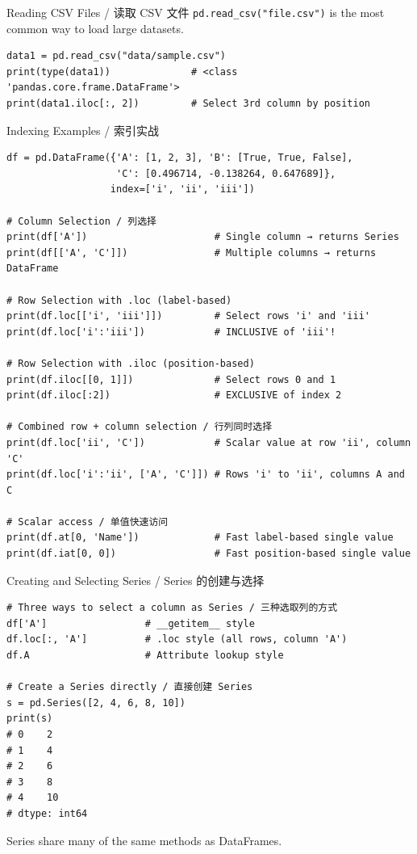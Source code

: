 \documentclass[11pt,a4paper]{report}
\let\oldtexttt\texttt
\renewcommand{\texttt}[1]{\textcolor{mainblue}{\oldtexttt{#1}}}
\begin{document}
\begin{examplebox}{Reading CSV Files / 读取 CSV 文件}
    \texttt{pd.read\_csv("file.csv")} is the most common way to load large datasets.
\begin{lstlisting}
data1 = pd.read_csv("data/sample.csv")
print(type(data1))              # <class 'pandas.core.frame.DataFrame'>
print(data1.iloc[:, 2])         # Select 3rd column by position
\end{lstlisting}
\end{examplebox}

\begin{examplebox}{Indexing Examples / 索引实战}
\begin{lstlisting}
df = pd.DataFrame({'A': [1, 2, 3], 'B': [True, True, False],
                   'C': [0.496714, -0.138264, 0.647689]},
                  index=['i', 'ii', 'iii'])

# Column Selection / 列选择
print(df['A'])                      # Single column → returns Series
print(df[['A', 'C']])               # Multiple columns → returns DataFrame

# Row Selection with .loc (label-based)
print(df.loc[['i', 'iii']])         # Select rows 'i' and 'iii'
print(df.loc['i':'iii'])            # INCLUSIVE of 'iii'!

# Row Selection with .iloc (position-based)
print(df.iloc[[0, 1]])              # Select rows 0 and 1
print(df.iloc[:2])                  # EXCLUSIVE of index 2

# Combined row + column selection / 行列同时选择
print(df.loc['ii', 'C'])            # Scalar value at row 'ii', column 'C'
print(df.loc['i':'ii', ['A', 'C']]) # Rows 'i' to 'ii', columns A and C

# Scalar access / 单值快速访问
print(df.at[0, 'Name'])             # Fast label-based single value
print(df.iat[0, 0])                 # Fast position-based single value
\end{lstlisting}
\end{examplebox}

\begin{examplebox}{Creating and Selecting Series / Series 的创建与选择}
\begin{lstlisting}
# Three ways to select a column as Series / 三种选取列的方式
df['A']                 # __getitem__ style
df.loc[:, 'A']          # .loc style (all rows, column 'A')
df.A                    # Attribute lookup style

# Create a Series directly / 直接创建 Series
s = pd.Series([2, 4, 6, 8, 10])
print(s)
# 0    2
# 1    4
# 2    6
# 3    8
# 4    10
# dtype: int64
\end{lstlisting}
    Series share many of the same methods as DataFrames.
\end{examplebox}
\end{document}
